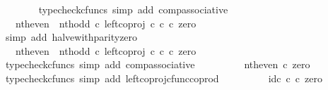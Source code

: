 \begin{isabellebody}
\ \ \ \ \ \ \isamarkupfalse%
\ {\isacharparenleft}{\kern0pt}typecheck{\isacharunderscore}{\kern0pt}cfuncs{\isacharcomma}{\kern0pt}\ simp\ add{\isacharcolon}{\kern0pt}\ comp{\isacharunderscore}{\kern0pt}associative{}{\isacharparenright}{\kern0pt}\isanewline
\ \ \ \ \isamarkupfalse%
\ \isamarkupfalse%
\ {\isachardoublequoteopen}{\isachardot}{\kern0pt}{\isachardot}{\kern0pt}{\isachardot}{\kern0pt}\ {\isacharequal}{\kern0pt}\ nth{\isacharunderscore}{\kern0pt}even\ {\isasymamalg}\ nth{\isacharunderscore}{\kern0pt}odd\ {\isasymcirc}\isactrlsub c\ left{\isacharunderscore}{\kern0pt}coproj\ {\isasymnat}\isactrlsub c\ {\isasymnat}\isactrlsub c\ {\isasymcirc}\isactrlsub c\ zero{\isachardoublequoteclose}\isanewline
\ \ \ \ \ \ \isamarkupfalse%
\ {\isacharparenleft}{\kern0pt}simp\ add{\isacharcolon}{\kern0pt}\ halve{\isacharunderscore}{\kern0pt}with{\isacharunderscore}{\kern0pt}parity{\isacharunderscore}{\kern0pt}zero{\isacharparenright}{\kern0pt}\isanewline
\ \ \ \ \isamarkupfalse%
\ \isamarkupfalse%
\ {\isachardoublequoteopen}{\isachardot}{\kern0pt}{\isachardot}{\kern0pt}{\isachardot}{\kern0pt}\ {\isacharequal}{\kern0pt}\ {\isacharparenleft}{\kern0pt}nth{\isacharunderscore}{\kern0pt}even\ {\isasymamalg}\ nth{\isacharunderscore}{\kern0pt}odd\ {\isasymcirc}\isactrlsub c\ left{\isacharunderscore}{\kern0pt}coproj\ {\isasymnat}\isactrlsub c\ {\isasymnat}\isactrlsub c{\isacharparenright}{\kern0pt}\ {\isasymcirc}\isactrlsub c\ zero{\isachardoublequoteclose}\isanewline
\ \ \ \ \ \ \isamarkupfalse%
\ {\isacharparenleft}{\kern0pt}typecheck{\isacharunderscore}{\kern0pt}cfuncs{\isacharcomma}{\kern0pt}\ simp\ add{\isacharcolon}{\kern0pt}\ comp{\isacharunderscore}{\kern0pt}associative{}{\isacharparenright}{\kern0pt}\isanewline
\ \ \ \ \isamarkupfalse%
\ \isamarkupfalse%
\ {\isachardoublequoteopen}{\isachardot}{\kern0pt}{\isachardot}{\kern0pt}{\isachardot}{\kern0pt}\ {\isacharequal}{\kern0pt}\ nth{\isacharunderscore}{\kern0pt}even\ {\isasymcirc}\isactrlsub c\ zero{\isachardoublequoteclose}\isanewline
\ \ \ \ \ \ \isamarkupfalse%
\ {\isacharparenleft}{\kern0pt}typecheck{\isacharunderscore}{\kern0pt}cfuncs{\isacharcomma}{\kern0pt}\ simp\ add{\isacharcolon}{\kern0pt}\ left{\isacharunderscore}{\kern0pt}coproj{\isacharunderscore}{\kern0pt}cfunc{\isacharunderscore}{\kern0pt}coprod{\isacharparenright}{\kern0pt}\isanewline
\ \ \ \ \isamarkupfalse%
\ \isamarkupfalse%
\ {\isachardoublequoteopen}{\isachardot}{\kern0pt}{\isachardot}{\kern0pt}{\isachardot}{\kern0pt}\ {\isacharequal}{\kern0pt}\ id\isactrlsub c\ {\isasymnat}\isactrlsub c\ {\isasymcirc}\isactrlsub c\ zero{\isachardoublequoteclose}\isanewline

\end{isabellebody}
